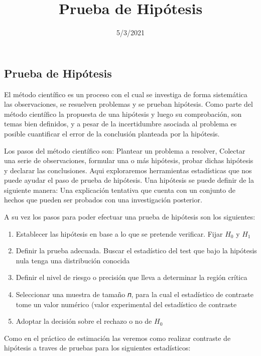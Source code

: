 \documentclass[
]{article}
\title{Prueba de Hipótesis}
\author{}
\date{\vspace{-2.5em}5/3/2021}
\begin{document}
\maketitle

\hypertarget{prueba-de-hipuxf3tesis}{%
\subsection{Prueba de Hipótesis}\label{prueba-de-hipuxf3tesis}}

El método científico es un proceso con el cual se investiga de forma
sistemática las observaciones, se resuelven problemas y se prueban
hipótesis. Como parte del método científico la propuesta de una
hipótesis y luego su comprobación, son temas bien definidos, y a pesar
de la incertidumbre asociada al problema es posible cuantificar el error
de la conclusión planteada por la hipótesis.

Los pasos del método científico son: Plantear un problema a resolver,
Colectar una serie de observaciones, formular una o más hipótesis,
probar dichas hipótesis y declarar las conclusiones. Aqui exploraremos
herramientas estadísticas que nos puede ayudar el paso de prueba de
hipótesis. Una hipótesis se puede definir de la siguiente manera: Una
explicación tentativa que cuenta con un conjunto de hechos que pueden
ser probados con una investigación posterior.

A su vez los pasos para poder efectuar una prueba de hipótesis son los
siguientes:

\begin{enumerate}
\def\labelenumi{\arabic{enumi})}
\item
  Establecer las hipótesis en base a lo que se pretende verificar. Fijar
  \(H_0\) y \(H_1\)
\item
  Definir la prueba adecuada. Buscar el estadístico del test que bajo la
  hipótesis nula tenga una distribución conocida
\item
  Definir el nivel de riesgo o precisión que lleva a determinar la
  región crítica
\item
  Seleccionar una muestra de tamaño 𝑛, para la cual el estadístico de
  contraste tome un valor numérico (valor experimental del estadístico
  de contraste
\item
  Adoptar la decisión sobre el rechazo o no de \(H_0\)
\end{enumerate}

Como en el práctico de estimación las veremos como realizar contraste de
hipótesis a traves de pruebas para los siguientes estadísticos:
\end{document}
